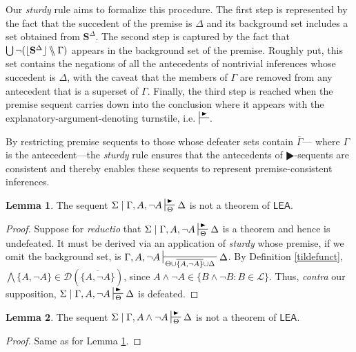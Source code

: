 \documentclass{article}
\theoremstyle{definition}
\theoremstyle{definition}
\theoremstyle{definition}
\newtheorem{lemma}{Lemma}
\theoremstyle{definition}
\theoremstyle{remark}
\theoremstyle{definition}
\theoremstyle{definition}
\begin{document}
Our \textit{sturdy} rule aims to formalize this procedure. The first step is represented by the fact that the succedent of the premise is $ \Delta $ and its background set includes a set obtained from $\mathbf{S}^\Delta $. The second step is captured by the fact that $ \bigcup\neg(\lfloor \mathbf{S}^\Delta \rfloor\bbslash\Gamma)$ appears in the background set of the premise. Roughly put, this set contains the negations of all the antecedents of nontrivial inferences whose succedent is $ \Delta $, with the caveat that the members of $ \Gamma $ are removed from any antecedent that is a superset of $ \Gamma $. Finally, the third step is reached when the premise sequent carries down into the conclusion where it appears with the explanatory-argument-denoting turnstile, i.e. $ \sststile{}{\RHD} $. 

By restricting premise sequents to those whose defeater sets contain $ \overline{\Gamma} $--- where $ \Gamma $ is the antecedent---the \textit{sturdy} rule ensures that the antecedents of $ \RHD $-sequents are consistent and thereby enables these sequents to represent premise-consistent inferences.

\begin{lemma}\label{inconsist}
	The sequent $ \Sigma\mid \Gamma, A, \neg A \sststile{\Theta}{\RHD}  \Delta $ is not a theorem of $ \mathsf{LEA}$.
	
	\begin{proof}
		Suppose for \textit{reductio} that $ \Sigma\mid \Gamma, A, \neg A \sststile{\Theta}{\RHD} \Delta $ is a theorem and hence is undefeated. It must be derived via an application of \textit{sturdy} whose premise, if we omit the background set, is $\Gamma, A, \neg A \sststile{\Theta\cup\overline{\{A, \neg A\}}\cup\Delta}{} \Delta $. By Definition \ref{tildefunct}, $\bigwedge\{A, \neg A \}\in \mathcal{D}(\overline{\{A, \neg A\}})$, since $ A \wedge \neg A \in  \{ B\wedge\neg B : B \in \mathcal{L} \}$. Thus, \textit{contra} our supposition,  $ \Sigma\mid \Gamma, A, \neg A \sststile{\Theta}{\RHD} \Delta $ is defeated.
	\end{proof}
\end{lemma}



\begin{lemma}\label{contradict}
	The sequent $ \Sigma\mid \Gamma, A \wedge \neg A \sststile{\Theta}{\RHD}  \Delta $ is not a theorem of $ \mathsf{LEA}$.
	
	\begin{proof} 
		Same as for Lemma \ref{inconsist}.
	\end{proof}
	
\end{lemma}
\end{document}
